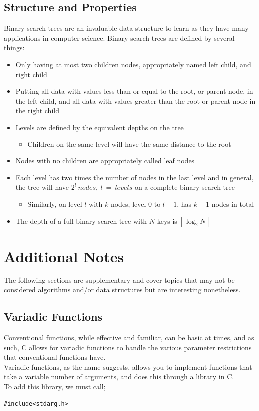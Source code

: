 \documentclass[hidelinks,11pt]{article}
\begin{document}
\subsection{Structure and Properties}
Binary search trees are an invaluable data structure to learn as they have many applications in computer science. Binary search trees are defined by several things:
\begin{itemize}
    \item Only having at most two children nodes, appropriately named left child, and right child
    \item Putting all data with values less than or equal to the root, or parent node, in the left child, and all data with values greater than the root or parent node in the right child
    \item Levels are defined by the equivalent depths on the tree
    \begin{itemize}
        \item Children on the same level will have the same distance to the root
    \end{itemize}
    \item Nodes with no children are appropriately called leaf nodes
    \item Each level has two times the number of nodes in the last level and in general, the tree will have $2^l\ nodes,\ l\ =\ levels$ on a complete binary search tree
    \begin{itemize}
        \item Similarly, on level $l$ with $k$ nodes, level $0$ to $l-1$, has $k-1$ nodes in total
    \end{itemize}
    \item The depth of a full binary search tree with $N$ keys is $\left \lceil{\log_2 N}\right \rceil $
\end{itemize}
\section{Additional Notes}
The following sections are supplementary and cover topics that may not be considered algorithms and/or data structures but are interesting nonetheless.
\subsection{Variadic Functions}
Conventional functions, while effective and familiar, can be basic at times, and as such, C allows for variadic functions to handle the various parameter restrictions that conventional functions have.\\[0.5\baselineskip]
Variadic functions, as the name suggests, allows you to implement functions that take a variable number of arguments, and does this through a library in C. \\[0.5\baselineskip]
To add this library, we must call;
\begin{lstlisting}[belowskip=-1.80 \baselineskip]
    #include<stdarg.h>
\end{lstlisting}
\end{document}
